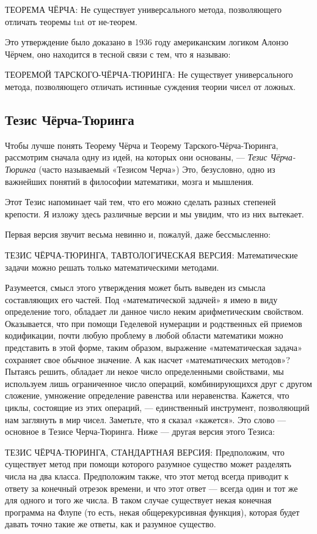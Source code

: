 \documentclass[../main.tex]{subfiles}
\begin{document}
ТЕОРЕМА ЧЁРЧА: Не существует универсального метода, позволяющего отличать теоремы \acs{tnt} от не-теорем.

Это утверждение было доказано в 1936 году американским логиком Алонзо Чёрчем, оно находится в тесной связи с тем, что я называю:

ТЕОРЕМОЙ ТАРСКОГО-ЧЁРЧА-ТЮРИНГА: Не существует универсального метода, позволяющего отличать истинные суждения теории чисел от ложных.


\subsection{Тезис Чёрча-Тюринга}

Чтобы лучше понять Теорему Чёрча и Теорему Тарского-Чёрча-Тюринга, рассмотрим сначала одну из идей, на которых они основаны, --- \emph{Тезис Чёрча-Тюринга} (часто называемый «Тезисом Черча») Это, безусловно, одно из важнейших понятий в философии математики, мозга и мышления.

Этот Тезис напоминает чай тем, что его можно сделать разных степеней крепости. Я изложу здесь различные версии и мы увидим, что из них вытекает.

Первая версия звучит весьма невинно и, пожалуй, даже бессмысленно:

ТЕЗИС ЧЁРЧА-ТЮРИНГА, ТАВТОЛОГИЧЕСКАЯ ВЕРСИЯ: Математические задачи можно решать только математическими методами.

Разумеется, смысл этого утверждения может быть выведен из смысла составляющих его частей. Под «математической задачей» я имею в виду определение того, обладает ли данное число неким арифметическим свойством. Оказывается, что при помощи Геделевой нумерации и родственных ей приемов кодификации, почти любую проблему в любой области математики можно представить в этой форме, таким образом, выражение «математическая задача» сохраняет свое обычное значение. А как насчет «математических методов»? Пытаясь решить, обладает ли некое число определенными свойствами, мы используем лишь ограниченное число операций, комбинирующихся друг с другом сложение, умножение определение равенства или неравенства. Кажется, что циклы, состоящие из этих операций, --- единственный инструмент, позволяющий нам заглянуть в мир чисел. Заметьте, что я сказал «кажется». Это слово --- основное в Тезисе Черча-Тюринга. Ниже --- другая версия этого Тезиса:

ТЕЗИС ЧЁРЧА-ТЮРИНГА, СТАНДАРТНАЯ ВЕРСИЯ: Предположим, что существует метод при помощи которого разумное существо может разделять числа на два класса. Предположим также, что этот метод всегда приводит к ответу за конечный отрезок времени, и что этот ответ --- всегда один и тот же для одного и того же числа. В таком случае существует некая конечная программа на Флупе (то есть, некая общерекурсивная функция), которая будет давать точно такие же ответы, как и разумное существо.
\end{document}
